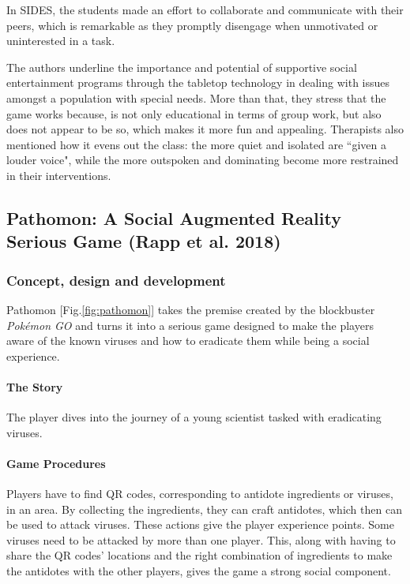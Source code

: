 \documentclass[runningheads]{llncs}
\begin{document}
\bigskip
\par In SIDES, the students made an effort to collaborate and communicate with their peers, which is remarkable as they promptly disengage when unmotivated or uninterested in a task.
\par The authors underline the importance and potential of supportive social entertainment programs through the tabletop technology in dealing with issues amongst a population with special needs. More than that, they stress that the game works because, is not only educational in terms of group work, but also does not appear to be so, which makes it more fun and appealing. Therapists also mentioned how it evens out the class: the more quiet and isolated are ``given a louder voice", while the more outspoken and dominating become more restrained in their interventions.



\subsection{Pathomon: A Social Augmented Reality Serious Game (Rapp et al. 2018)}

\subsubsection{Concept, design and development}
\par Pathomon [Fig.\ref{fig:pathomon}] takes the premise created by the blockbuster \textit{Pokémon GO} and turns it into a serious game designed to make the players aware of the known viruses and how to eradicate them while being a social experience.

\paragraph{The Story} The player dives into the journey of a young scientist tasked with eradicating viruses.

\paragraph{Game Procedures} Players have to find QR codes, corresponding to antidote ingredients or viruses, in an area. By collecting the ingredients, they can craft antidotes, which then can be used to attack viruses. These actions give the player experience points. Some viruses need to be attacked by more than one player. This, along with having to share the QR codes' locations and the right combination of ingredients to make the antidotes with the other players, gives the game a strong social component.
\end{document}
